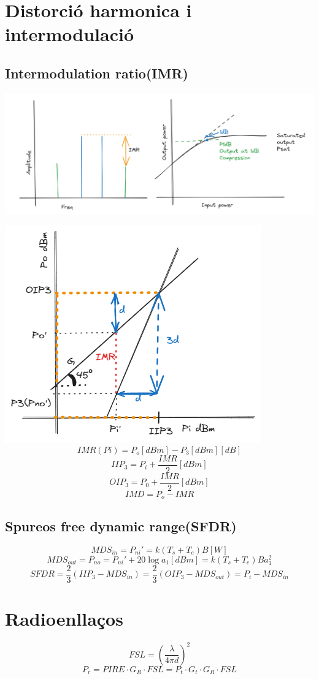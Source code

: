 \documentclass{article}
\begin{document}
\begin{multicols*}{2}
	\section{Distorció harmonica i intermodulació}
	\subsection{Intermodulation ratio(IMR)}
	\includegraphics[width=1\linewidth]{IMRcompresion.png}

	\includegraphics[width=1\linewidth]{OIPIIP3.png}
	$$IMR(Pi)=P_o[dBm]-P_3[dBm] [dB]$$
	$$IIP_3=P_i+\frac{IMR}{2} [dBm]$$
	$$OIP_3=P_0+\frac{IMR}{2} [dBm]$$
	$$IMD=P_o-IMR$$
	\subsection{Spureos free dynamic range(SFDR)}
	$$MDS_{in}=P_{ni}'=k(T_s+T_e)B [W]$$
	$$MDS_{out}=P_{no}=P_{ni}'+20\log a_1 [dBm]=k(T_s+T_e)Ba_1^2$$
	$$SFDR=\frac{2}{3}(IIP_3-MDS_{in})=\frac{2}{3}(OIP_3-MDS_{out})=P_i-MDS_{in} $$
	\section{Radioenllaços}
	$$FSL=(\frac{\lambda}{4\pi d})^2$$
	$$P_r=PIRE\cdot G_R\cdot FSL=P_t\cdot G_t\cdot G_R\cdot FSL$$
\end{multicols*}
\end{document}
